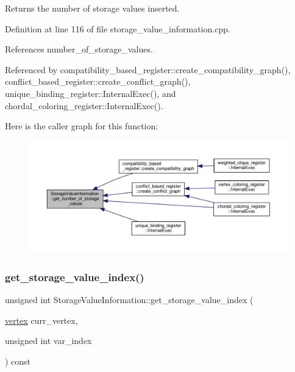 Returns the number of storage values inserted. 



Definition at line 116 of file storage\+\_\+value\+\_\+information.\+cpp.



References number\+\_\+of\+\_\+storage\+\_\+values.



Referenced by compatibility\+\_\+based\+\_\+register\+::create\+\_\+compatibility\+\_\+graph(), conflict\+\_\+based\+\_\+register\+::create\+\_\+conflict\+\_\+graph(), unique\+\_\+binding\+\_\+register\+::\+Internal\+Exec(), and chordal\+\_\+coloring\+\_\+register\+::\+Internal\+Exec().

Here is the caller graph for this function\+:
\nopagebreak
\begin{figure}[H]
\begin{center}
\leavevmode
\includegraphics[width=350pt]{d8/dbe/classStorageValueInformation_a5ccb95e3ac0776910f8967099f46a679_icgraph}
\end{center}
\end{figure}
\mbox{\label{classStorageValueInformation_a03f6c3fab2ebcf00fd56fda4b32194a2}} 
\subsubsection{\texorpdfstring{get\+\_\+storage\+\_\+value\+\_\+index()}{get\_storage\_value\_index()}}
{\footnotesize\ttfamily unsigned int Storage\+Value\+Information\+::get\+\_\+storage\+\_\+value\+\_\+index (\begin{DoxyParamCaption}\item[{\hyperlink{graph_8hpp_abefdcf0544e601805af44eca032cca14}{vertex}}]{curr\+\_\+vertex,  }\item[{unsigned int}]{var\+\_\+index }\end{DoxyParamCaption}) const}




